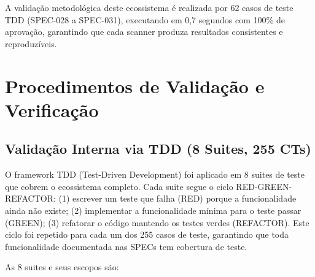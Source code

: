 A validação metodológica deste ecossistema é realizada por 62 casos de teste TDD (SPEC-028 a SPEC-031), executando em 0,7 segundos com 100\% de aprovação, garantindo que cada scanner produza resultados consistentes e reproduzíveis.

\section{Procedimentos de Validação e Verificação}

\subsection{Validação Interna via TDD (8 Suites, 255 CTs)}

O framework TDD (Test-Driven Development) foi aplicado em 8 suites de teste que cobrem o ecossistema completo. Cada suite segue o ciclo RED-GREEN-REFACTOR: (1) escrever um teste que falha (RED) porque a funcionalidade ainda não existe; (2) implementar a funcionalidade mínima para o teste passar (GREEN); (3) refatorar o código mantendo os testes verdes (REFACTOR). Este ciclo foi repetido para cada um dos 255 casos de teste, garantindo que toda funcionalidade documentada nas SPECs tem cobertura de teste.

As 8 suites e seus escopos são:

